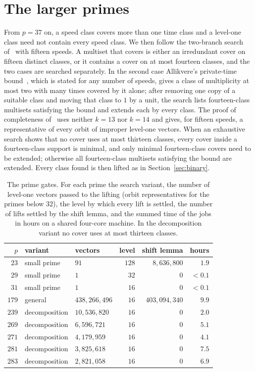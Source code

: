 \documentclass[11pt]{amsart}
\theoremstyle{definition}
\theoremstyle{remark}
\newenvironment{wtable}{\begin{table}[t]}{\end{table}}
\begin{document}
\section{The larger primes}\label{sec:large}

From $p=37$ on, a speed class covers more than one time class and a
level-one class need not contain every speed class. We then follow the
two-branch search of~\cite[Sect.~4.1]{All26} with fifteen speeds. A
multiset that covers is either an irredundant cover on fifteen distinct
classes, or it contains a cover on at most fourteen classes, and the two
cases are searched separately. In the second case Allikvere's private-time
bound~\cite[Lemma~4.1]{All26}, which is stated for any number of speeds,
gives a class of multiplicity at most two with many times covered by it
alone; after removing one copy of a suitable class and moving that class to
$1$ by a unit, the search lists fourteen-class multisets satisfying the bound
and extends each by every class. The proof of completeness
of~\cite[Proposition~4.2]{All26} uses neither $k=13$ nor $k=14$ and gives,
for fifteen speeds, a representative of every orbit of improper level-one
vectors. When an exhaustive search shows that no cover uses at most thirteen
classes, every cover inside a fourteen-class support is minimal, and only
minimal fourteen-class covers need to be extended; otherwise all
fourteen-class multisets satisfying the bound are extended. Every class
found is then lifted as in Section~\ref{sec:binary}.

\begin{wtable}
\caption{The prime gates. For each prime the search variant, the number of
level-one vectors passed to the lifting (orbit representatives for the
primes below $32$), the level by which every lift is settled, the number of
lifts settled by the shift lemma, and the summed time of the jobs in hours
on a shared four-core machine. In the decomposition variant no cover uses
at most thirteen classes.}
\label{tab:results}
\centering
\small
\begin{tabular}{@{}rllrrr@{}}
\toprule
$p$ & variant & vectors & level & shift lemma & hours\\
\midrule
$23$ & small prime & $91$ & $128$ & $8{,}636{,}800$ & $1.9$\\
$29$ & small prime & $1$ & $32$ & $0$ & $<0.1$\\
$31$ & small prime & $1$ & $16$ & $0$ & $<0.1$\\
$179$ & general & $438{,}266{,}496$ & $16$ & $403{,}094{,}340$ & $9.9$\\
$239$ & decomposition & $10{,}536{,}820$ & $16$ & $0$ & $2.0$\\
$269$ & decomposition & $6{,}596{,}721$ & $16$ & $0$ & $5.1$\\
$271$ & decomposition & $4{,}179{,}959$ & $16$ & $0$ & $4.1$\\
$281$ & decomposition & $3{,}825{,}618$ & $16$ & $0$ & $7.5$\\
$283$ & decomposition & $2{,}821{,}058$ & $16$ & $0$ & $6.9$\\
\bottomrule
\end{tabular}
\end{wtable}
\end{document}
